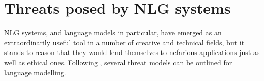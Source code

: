 \section{Threats posed by NLG systems}

NLG systems, and language models in particular, have emerged as an extraordinarily useful tool in a number of creative and technical fields, but it stands to reason that they would lend themselves to nefarious applications just as well as ethical ones.
Following \citealp{crothers2023machinegeneratedtextcomprehensive}, several threat models \citep{shostack2014security} can be outlined for language modelling.